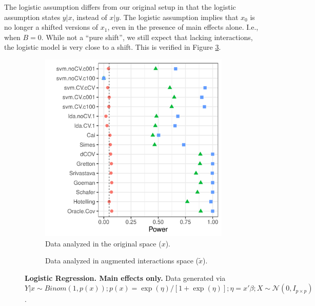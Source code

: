 \documentclass[]{bio}
\begin{document}
The logistic assumption differs from our original setup in that the logistic assumption states $y|x$, instead of $x|y$. 
The logistic assumption implies that $x_0$ is no longer a shifted versions of $x_1$, even in the presence of main effects alone. 
I.e., when $B=0$.
While not a ``pure shift'', we still expect that lacking interactions, the logistic model is very close to a shift. 
This is verified in Figure \ref{fig:logistic-main-only}.




\begin{figure}[th]
	\centering
	\begin{subfigure}[t]{.45\columnwidth}
		\centering
		\includegraphics[width=1\columnwidth]{"art/file40"}
		\caption{Data analyzed in the original space ($x$).}
		\label{fig:main-only-original-space}
	\end{subfigure}
	\begin{subfigure}[t]{.45\columnwidth}
		\centering
		\caption{Data analyzed in augmented interactions space ($\tilde x$).}
		\label{fig:main-only-augmented-space}
	\end{subfigure}
	\caption{\textbf{Logistic Regression. Main effects only.} 
	Data generated via 
	$Y|x \sim Binom(1,p(x));
	p(x)=\exp(\eta)/[1+\exp(\eta)];
	\eta=x'\beta; 
	X\sim \mathcal{N}(0,I_{p\times p})$.  } 
	\label{fig:logistic-main-only}
\end{figure}
\end{document}
